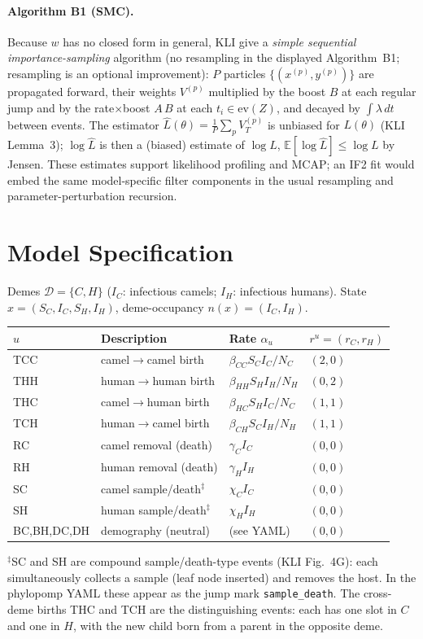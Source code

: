 \documentclass[11pt]{article}
\newcommand{\E}{\mathbb{E}}
\newcommand{\evZ}{\mathrm{ev}(Z)}
\theoremstyle{plain}
\begin{document}
\paragraph{Algorithm B1 (SMC).} Because $w$ has no closed form in general, KLI give a \emph{simple
sequential importance-sampling} algorithm (no resampling in the displayed Algorithm~B1; resampling is an
optional improvement): $P$ particles $\{(x^{(p)},y^{(p)})\}$ are propagated forward, their weights
$V^{(p)}$ multiplied by the boost $B$ at each regular jump and by the rate$\times$boost $A\,B$ at each
$t_i\in\evZ$, and decayed by $\int\lambda\,dt$ between events. The estimator
$\hat L(\theta)=\tfrac1P\sum_p V_T^{(p)}$ is unbiased for $L(\theta)$ (KLI Lemma~3); $\log\hat L$ is then
a (biased) estimate of $\log L$, $\E[\log\hat L]\le\log L$ by Jensen. These estimates support
likelihood profiling and MCAP; an IF2 fit would embed the same model-specific filter components in the
usual resampling and parameter-perturbation recursion.

\section{Model Specification}
Demes $\mathcal D=\{C,H\}$ ($I_C$: infectious camels; $I_H$: infectious humans). State
$x=(S_C,I_C,S_H,I_H)$, deme-occupancy $n(x)=(I_C,I_H)$.
\begin{center}
\begin{tabular}{@{}llll@{}}
\toprule
$u$ & Description & Rate $\alpha_u$ & $r^u=(r_C,r_H)$\\
\midrule
TCC & camel$\to$camel birth & $\beta_{CC}S_CI_C/N_C$ & $(2,0)$\\
THH & human$\to$human birth & $\beta_{HH}S_HI_H/N_H$ & $(0,2)$\\
THC & camel$\to$human birth & $\beta_{HC}S_HI_C/N_C$ & $(1,1)$\\
TCH & human$\to$camel birth & $\beta_{CH}S_CI_H/N_H$ & $(1,1)$\\
RC  & camel removal (death) & $\gamma_C I_C$ & $(0,0)$\\
RH  & human removal (death) & $\gamma_H I_H$ & $(0,0)$\\
SC  & camel sample/death$^\ddagger$ & $\chi_C I_C$ & $(0,0)$\\
SH  & human sample/death$^\ddagger$ & $\chi_H I_H$ & $(0,0)$\\
BC,BH,DC,DH & demography (neutral) & (see YAML) & $(0,0)$\\
\bottomrule
\end{tabular}
\end{center}
$^\ddagger$SC and SH are compound sample/death-type events (KLI Fig.~4G): each simultaneously
collects a sample (leaf node inserted) and removes the host. In the phylopomp YAML these appear as
the jump mark \texttt{sample\_death}. The cross-deme births THC and TCH are the distinguishing
events: each has one slot in $C$ and one in $H$, with the new child born from a parent in the
opposite deme.
\end{document}
